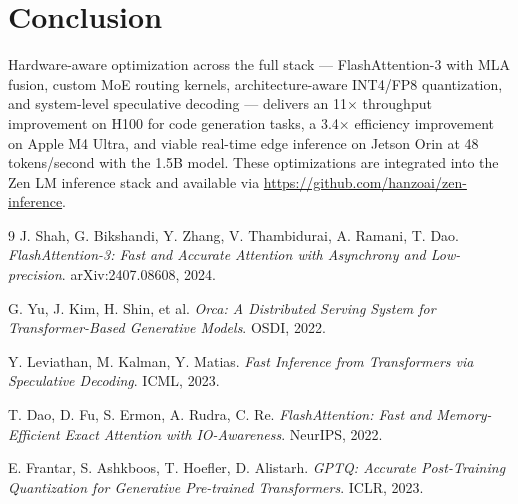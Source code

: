 \documentclass[11pt,a4paper]{article}
\begin{document}
\section{Conclusion}
\label{sec:conclusion}

Hardware-aware optimization across the full stack — FlashAttention-3 with MLA fusion,
custom MoE routing kernels, architecture-aware INT4/FP8 quantization, and system-level
speculative decoding — delivers an 11$\times$ throughput improvement on H100 for code
generation tasks, a 3.4$\times$ efficiency improvement on Apple M4 Ultra, and viable
real-time edge inference on Jetson Orin at 48 tokens/second with the 1.5B model. These
optimizations are integrated into the Zen LM inference stack and available via
\url{https://github.com/hanzoai/zen-inference}.

\begin{thebibliography}{9}
J. Shah, G. Bikshandi, Y. Zhang, V. Thambidurai, A. Ramani, T. Dao.
\textit{FlashAttention-3: Fast and Accurate Attention with Asynchrony and Low-precision}.
arXiv:2407.08608, 2024.

G. Yu, J. Kim, H. Shin, et al.
\textit{Orca: A Distributed Serving System for Transformer-Based Generative Models}.
OSDI, 2022.

Y. Leviathan, M. Kalman, Y. Matias.
\textit{Fast Inference from Transformers via Speculative Decoding}.
ICML, 2023.

T. Dao, D. Fu, S. Ermon, A. Rudra, C. Re.
\textit{FlashAttention: Fast and Memory-Efficient Exact Attention with IO-Awareness}.
NeurIPS, 2022.

E. Frantar, S. Ashkboos, T. Hoefler, D. Alistarh.
\textit{GPTQ: Accurate Post-Training Quantization for Generative Pre-trained Transformers}.
ICLR, 2023.
\end{thebibliography}
\end{document}
